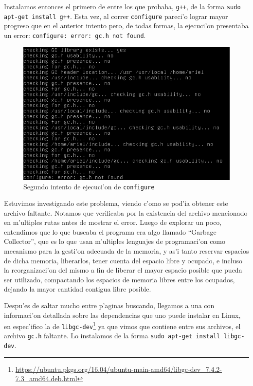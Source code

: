 \documentclass[11pt]{article}
\begin{document}
		Instalamos entonces el primero de entre los que probaba, \texttt{g++}, de la forma \texttt{sudo apt-get install g++}. Esta vez, al correr \texttt{configure} pareci'o lograr mayor progreso que en el anterior intento pero, de todas formas, la ejecuci'on presentaba un error: \texttt{configure: error: gc.h not found}.
		
		\begin{figure}[H]
			\centering \captionsetup{justification=centering}
			\includegraphics[width=.8\linewidth]{Images/Compile_w3m/gc_missing}
			\caption{Segundo intento de ejecuci'on de \texttt{configure}}
			\label{fig:gc_missing}
		\end{figure}
		
		Estuvimos investigando este problema, viendo c'omo se pod'ia obtener este archivo faltante. Notamos que verificaba por la existencia del archivo mencionado en m'ultiples rutas antes de mostrar el error. Luego de explorar un poco, entendimos que lo que buscaba el programa era algo llamado ``Garbage Collector'', que es lo que usan m'ultiples lenguajes de programaci'on como mecanismo para la gesti'on adecuada de la memoria, y as'i tanto reservar espacios de dicha memoria, liberarlos, tener cuenta del espacio libre y ocupado, e incluso la reorganizaci'on del mismo a fin de liberar el mayor espacio posible que pueda ser utilizado, compactando los espacios de memoria libres entre los ocupados, dejando la mayor cantidad contigua libre posible. 
		
		Despu'es de saltar mucho entre p'aginas buscando, llegamos a una con informaci'on detallada sobre las dependencias que uno puede instalar en Linux, en espec'ifico la de \texttt{libgc-dev}\footnote{\url{https://ubuntu.pkgs.org/16.04/ubuntu-main-amd64/libgc-dev_7.4.2-7.3_amd64.deb.html}} ya que vimos que contiene entre sus archivos, el archivo \texttt{gc.h} faltante. Lo instalamos de la forma \texttt{sudo apt-get install libgc-dev}.
		
\end{document}

